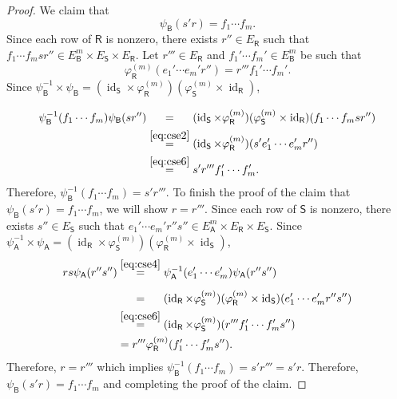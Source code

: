 \documentclass[11pt, letterpaper,final]{amsart}
\newcommand{\id}{\operatorname{id}}
\theoremstyle{definition}
\begin{document}
\begin{proof}
We claim that 
\begin{equation}\label{eq:cse5}
    \psi_\mathsf{B}(s'r) = f_1 \cdots f_m.
\end{equation}
Since each row of $\mathsf{R}$ is nonzero, there exists $r'' \in E_\mathsf{R}$ such that $f_1 \cdots f_m s r'' \in E_\mathsf{B}^m \times E_\mathsf{S} \times E_\mathsf{R}$. Let $r''' \in E_\mathsf{R}$ and $f_1'\cdots f_m' \in E_\mathsf{B}^m$ be such that 
\begin{equation}\label{eq:cse6}
\varphi_\mathsf{R}^{(m)}( e_1'\cdots e_m' r'' ) = r''' f_1'\cdots f_m'.
\end{equation}
Since  $\psi_\mathsf{B}^{-1} \times \psi_\mathsf{B} = (\id_\mathsf{S} \times \varphi_\mathsf{R}^{(m)}) ( \varphi_\mathsf{S}^{(m)} \times \id_\mathsf{R})$, 
\begin{align*}
\psi_\mathsf{B}^{-1}( f_1 \cdots f_m) \psi_\mathsf{B}(sr'') &\overset{\phantom{\eqref{eq:cse2}}}{=} (\id_\mathsf{S} \times \varphi_\mathsf{R}^{(m)}) ( \varphi_\mathsf{S}^{(m)} \times \id_\mathsf{R})(f_1\cdots f_m sr'') \\
&\overset{\eqref{eq:cse2}}{=} (\id_\mathsf{S} \times \varphi_\mathsf{R}^{(m)})(s' e_1'\cdots e_m' r'') \\
&\overset{\eqref{eq:cse6}}{=}  s' r''' f_1' \cdots f_m'.
\end{align*}
Therefore, $\psi_\mathsf{B}^{-1}(f_1 \cdots f_m)=s' r'''$.  To finish the proof of the claim that $\psi_\mathsf{B}(s'r)=f_1 \cdots f_m$, we will show $r=r'''$.  Since each row of $\mathsf{S}$ is nonzero, there exists $s'' \in E_\mathsf{S}$ such that $e_1'\cdots e_m' r'' s'' \in E_\mathsf{A}^m \times E_\mathsf{R} \times E_\mathsf{S}$.  Since $\psi_\mathsf{A}^{-1} \times \psi_\mathsf{A} = (\id_\mathsf{R} \times \varphi_\mathsf{S}^{(m)}) ( \varphi_\mathsf{R}^{(m)} \times \id_\mathsf{S})$,
\begin{align*}
rs \psi_\mathsf{A}(r''s'') &\overset{\eqref{eq:cse4}}{=} \psi_\mathsf{A}^{-1}( e_1'\cdots e_m')\psi_\mathsf{A} (r''s'')  \\
                &\overset{\phantom{\eqref{eq:cse6}}}{=}(\id_\mathsf{R} \times \varphi_\mathsf{S}^{(m)} )( \varphi_\mathsf{R}^{(m)} \times \id_\mathsf{S})(e_1'\cdots e_m' r'' s'') \\
                &\overset{\eqref{eq:cse6}}{=}(\id_\mathsf{R} \times \varphi_\mathsf{S}^{(m)} ) (r''' f_1'\cdots f_m' s'')\\
                &=r''' \varphi_\mathsf{R}^{(m)}(f_1'\cdots f_m' s'').
\end{align*}
Therefore, $r=r'''$ which implies $\psi_\mathsf{B}^{-1}(f_1\cdots f_m)=s'r''' = s'r$.  Therefore, $\psi_\mathsf{B}(s'r)=f_1\cdots f_m$ and completing the proof of the claim. 


\end{proof}
\end{document}
